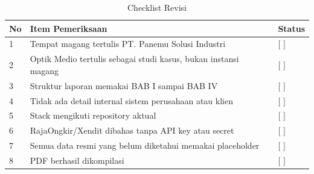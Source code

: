 \documentclass[12pt,a4paper]{report}
\begin{document}
\begin{longtable}{|p{1cm}|p{10cm}|p{3cm}|}
\caption{Checklist Revisi}\\
\hline
No & Item Pemeriksaan & Status\\ \hline
1 & Tempat magang tertulis PT. Panemu Solusi Industri & [ ]\\ \hline
2 & Optik Medio tertulis sebagai studi kasus, bukan instansi magang & [ ]\\ \hline
3 & Struktur laporan memakai BAB I sampai BAB IV & [ ]\\ \hline
4 & Tidak ada detail internal sistem perusahaan atau klien & [ ]\\ \hline
5 & Stack mengikuti repository aktual & [ ]\\ \hline
6 & RajaOngkir/Xendit dibahas tanpa API key atau secret & [ ]\\ \hline
7 & Semua data resmi yang belum diketahui memakai placeholder & [ ]\\ \hline
8 & PDF berhasil dikompilasi & [ ]\\ \hline
\end{longtable}
\end{document}
